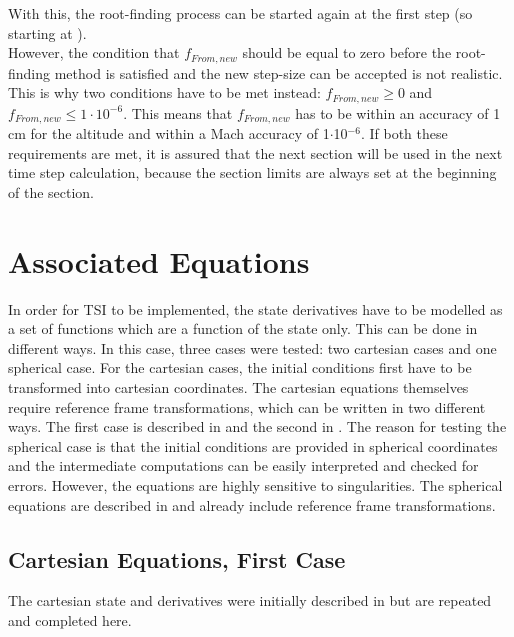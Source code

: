 \noindent
With this, the root-finding process can be started again at the first step (so starting at ).\\

\noindent
However, the condition that $f_{From,new}$ should be equal to zero before the root-finding method is satisfied and the new step-size can be accepted is not realistic. This is why two conditions have to be met instead: $f_{From,new}\geq 0$ and $f_{From,new}\leq 1\cdot10^{-6}$. This means that $f_{From,new}$ has to be within an accuracy of 1 cm for the altitude and within a Mach accuracy of 1$\cdot$10$^{-6}$. If both these requirements are met, it is assured that the next section will be used in the next time step calculation, because the section limits are always set at the beginning of the section.  




\section{Associated Equations}
\label{sec:assEq}
In order for \ac{TSI} to be implemented, the state derivatives have to be modelled as a set of functions which are a function of the state only. This can be done in different ways. In this case, three cases were tested: two cartesian cases and one spherical case. For the cartesian cases, the initial conditions first have to be transformed into cartesian coordinates. The cartesian equations themselves require reference frame transformations, which can be written in two different ways. The first case is described in  and the second in . The reason for testing the spherical case is that the initial conditions are provided in spherical coordinates and the intermediate computations can be easily interpreted and checked for errors. However, the equations are highly sensitive to singularities. The spherical equations are described in  and already include reference frame transformations. 

\subsection{Cartesian Equations, First Case}
\label{subsec:careq}
The cartesian state and derivatives were initially described in  but are repeated and completed here.

